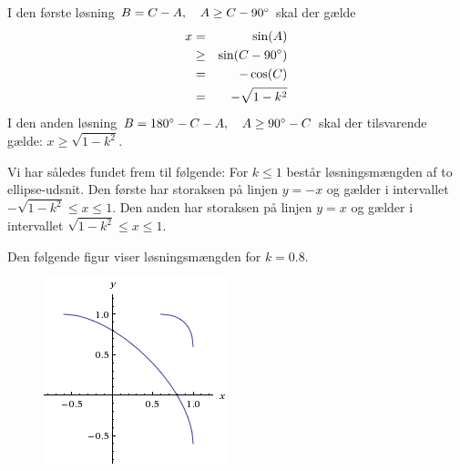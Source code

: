 \documentclass[12pt,oneside,a4paper]{article}
\newcommand{\bas}{\begin{eqnarray*}}
\newcommand{\eas}{\end{eqnarray*}}
\begin{document}
I den første løsning $B = C-A, \quad A \ge C-90\degree$ skal der gælde
\bas
x &=& \sin(A) \\
  &\ge& \sin(C-90\degree) \\
  &=& -\cos(C) \\
  &=& -\sqrt{1-k^2}
\eas
I den anden løsning $B = 180\degree - C - A, \quad A \ge 90\degree-C$
skal der tilsvarende gælde: $x \ge \sqrt{1-k^2}$.

Vi har således fundet frem til følgende: For $k \le 1$ består løsningsmængden af to ellipse-udsnit. Den første har storaksen på linjen $y=-x$ og gælder i intervallet $-\sqrt{1-k^2} \le x \le 1$. Den anden har storaksen på linjen $y=x$ og gælder i intervallet $\sqrt{1-k^2} \le x \le 1$.

Den følgende figur viser løsningsmængden for $k=0.8$.

\begin{figure}[ht]
\begin{center}
\includegraphics{opg6.png}
\label{fig1}
\end{center}
\end{figure}
\end{document}
